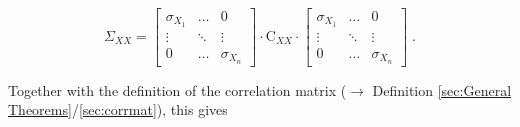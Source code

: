 \documentclass[a4paper,12pt,twoside]{book}
\begin{document}
\begin{equation} \label{eq:covmat-corrmat-covmat-corrmat-s1}
\Sigma_{XX} =
\begin{bmatrix}
\sigma_{X_1} & \ldots & 0 \\
\vdots & \ddots & \vdots \\
0 & \ldots & \sigma_{X_n}
\end{bmatrix} \cdot
\mathrm{C}_{XX} \cdot
\begin{bmatrix}
\sigma_{X_1} & \ldots & 0 \\
\vdots & \ddots & \vdots \\
0 & \ldots & \sigma_{X_n}
\end{bmatrix} \; .
\end{equation}

Together with the definition of the correlation matrix ($\rightarrow$ Definition \ref{sec:General Theorems}/\ref{sec:corrmat}), this gives
\end{document}

